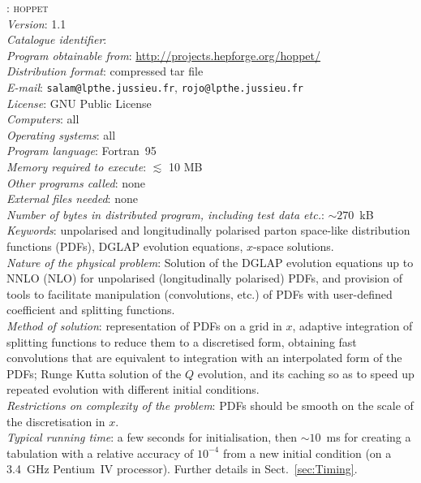 \documentclass[12pt]{article}
\newcommand{\hoppet}{\textsc{hoppet}\xspace}
\begin{document}
: \hoppet \\[2mm]
{\em Version\/}: 1.1 \\[2mm]
{\em Catalogue identifier\/}: \\[2mm]
{\em Program obtainable from\/}:
\url{http://projects.hepforge.org/hoppet/}
\\[2mm]
{\em Distribution format\/}: compressed tar file \\[2mm]
{\em E-mail\/}: {\tt salam@lpthe.jussieu.fr}, 
{\tt rojo@lpthe.jussieu.fr} \\[2mm]
{\em License\/}: GNU Public License \\[2mm]
{\em Computers\/}: all \\[2mm]
{\em Operating systems\/}: all \\[2mm]
{\em Program language\/}: Fortran~95 \\[2mm]
{\em Memory required to execute\/}:  $\lesssim$ 10 MB \\[2mm]
{\em Other programs called\/}: none \\[2mm]
{\em External files needed\/}: none \\[2mm]
{\em Number of bytes in distributed program, including test data
  etc.\/}: $\sim 270$~kB\\[2mm]
{\em Keywords\/}: unpolarised and longitudinally polarised parton
space-like distribution functions (PDFs), DGLAP evolution equations,
$x$-space solutions.
\\[2mm]
{\em Nature of the physical problem\/}: Solution of the DGLAP
evolution equations up to NNLO (NLO) for unpolarised (longitudinally
polarised) PDFs, and provision of tools to facilitate manipulation
(convolutions, etc.) of PDFs with user-defined coefficient and
splitting functions.
\\[2mm]
%
{\em Method of solution\/}:
representation of PDFs on a grid in $x$, adaptive integration of
splitting functions to reduce them to a discretised
form, obtaining fast
convolutions that are equivalent to integration with an interpolated
form of the PDFs; Runge Kutta solution of the $Q$ evolution, and
its caching so as to speed up repeated evolution with different
initial conditions.
\\[2mm]
{\em Restrictions on complexity of the problem\/}: PDFs should be
smooth on the scale of the discretisation in $x$.
\\[2mm]
{\em Typical running time\/}: a few seconds for initialisation, then
$\sim 10$~ms for creating a tabulation with a relative accuracy of
$10^{-4}$ from a new initial condition (on a 3.4~GHz Pentium~IV
processor). Further details in Sect.~\ref{sec:Timing}.
\end{document}
